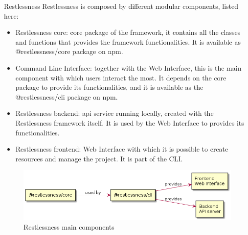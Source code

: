 \begin{chapter}{Restlessness}
    Restlessness is composed by different modular components, listed here:
    \begin{itemize}
        \item Restlessness core: core package of the framework, it contains all the
            classes and functions that provides the framework functionalities. It is
            available as \mbox{@restlessness/core} package on npm.
        \item Command Line Interface: together with the Web Interface, this is the
            main component with which users interact the most. It depends on the
            core package to provide its functionalities, and it is available as
            the \mbox{@restlessness/cli} package on npm.
        \item Restlessness backend: api service running locally, created with the
            Restlessness framework itself. It is used by the Web Interface to
            provides its functionalities.
        \item Restlessness frontend: Web Interface with which it is possible to
            create resources and manage the project. It is part of the CLI.
    \end{itemize}
    \begin{figure}
        \centering
        \includegraphics[width=\linewidth]{source/diagrams/rln_components.png}
        \caption{Restlessness main components}
    \end{figure}


\end{chapter}
